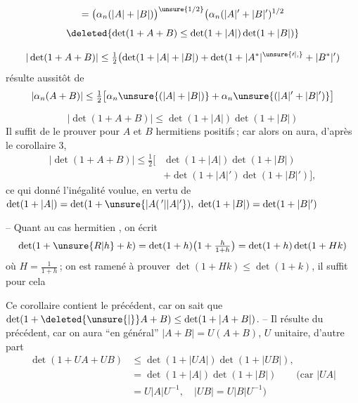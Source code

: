 \[
=\bigl(\alpha_n(|A|+|B|)\bigr)^{\unsure{1/2}}\bigl(\alpha_n(|A|'+|B|')^{1/2}
\]
\[
\deleted{\det(1+A+B)\leq\det(1+|A|)\det(1+|B|)}
\]

\[
|\det(1+A+B)|\leq\tfrac12\bigl(\det(1+|A|+|B|)+\det(1+|A^*|^{\unsure{\prime|,}}+|B^*|')\bigr.
\]
résulte aussitôt de
\[
|\alpha_n(A+B)|\leq\tfrac12\bigl[\alpha_n\unsure{(|A|+|B|)}+\alpha_n\unsure{(|A|'+|B|')}\bigr]
\]

\[
\boxed{|\det(1+A+B)|\leq\det(1+|A|)\det(1+|B|)}
\]
Il suffit de  le prouver pour $A$ et $B$
hermitiens positifs\,; car alors on aura, d'après
le corollaire 3,
\[
\begin{aligned}
|\det(1+A+B)|\leq\tfrac12\bigl[&\det(1+|A|)\det(1+|B|)\\
&+\det(1+|A|')\det(1+|B|')\bigr],
\end{aligned}
\]
ce qui donné l'inégalité voulue, en vertu de
$\det(1+|A|)=\det(1+\unsure{\lvert A(\,{}'|\lvert A\rvert'}),\ \det(1+|B|)=\det(1+|B|')$

-- Quant au cas hermitien , on écrit
\[
\det(1+\unsure{R|h}+k)=\det(1+h)\bigl(1+\tfrac{h}{1+h}\bigr)=\det(1+h)\det(1+Hk)
\]
où $H=\frac{1}{1+h}$\,; on est ramené à prouver
$\det(1+Hk)\leq\det(1+k)$, il suffit pour cela

Ce corollaire contient le précédent, car on sait
que $\det(1+\deleted{\unsure{|}}A+B)\leq\det(1+|A+B|)$. -- Il
résulte du précédent, car on aura ``en général''
$|A+B|=U(A+B)$, $U$ unitaire, d'autre part
\[
\begin{aligned}
\det(1+UA+UB)&\leq\det(1+|UA|)\det(1+|UB|),\\
&=\det(1+|A|)\det(1+|B|)\qquad(\text{car } |UA|\\
&=U|A|U^{-1},\quad |UB|=U|B|U^{-1})
\end{aligned}
\]
